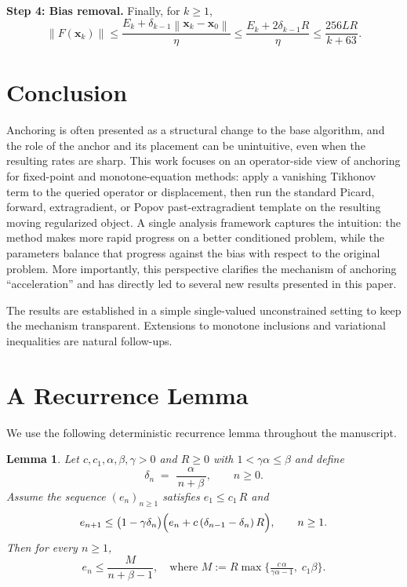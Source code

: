 \documentclass[letterpaper,11pt]{article}
\newcommand{\norm}[1]{\left\| #1 \right\|}
\newcommand{\vect}[1]{\mathbf{#1}}
\newtheorem{lemma}{Lemma}
\begin{document}
\smallskip
\noindent\textbf{Step 4: Bias removal.}
Finally, for \(k\ge1\),
\[
\norm{F(\vect{x}_k)}
\le
\frac{E_k+\delta_{k-1}\norm{\vect{x}_k-\vect{x}_0}}{\eta}
\le
\frac{E_k+2\delta_{k-1}R}{\eta}
\le
\frac{256LR}{k+63}.
\]



\section{Conclusion}
\label{sec:conclusion}

Anchoring is often presented as a structural change to the base algorithm, and the role of the anchor and its placement can be unintuitive, even when the resulting rates are sharp. This work focuses on an operator-side view of anchoring for fixed-point and monotone-equation methods: apply a vanishing Tikhonov term to the queried operator or displacement, then run the standard Picard, forward, extragradient, or Popov past-extragradient template on the resulting moving regularized object. A single analysis framework captures the intuition: the method makes more rapid progress on a better conditioned problem, while the parameters balance that progress against the bias with respect to the original problem. More importantly, this perspective clarifies the mechanism of anchoring ``acceleration'' and has directly led to several new results presented in this paper.

The results are established in a simple single-valued unconstrained setting to keep the mechanism transparent. Extensions to monotone inclusions and variational inequalities are natural follow-ups.

\appendix
{}
\section{A Recurrence Lemma}\label{app:technical-lemma}
We use the following deterministic recurrence lemma throughout the manuscript.

\begin{lemma}\label{lem:recurrence}
Let \(c,c_1,\alpha,\beta,\gamma>0\) and \(R\ge0\) with $1 < \gamma \alpha \le \beta$ and define
\[
   \delta_n \;=\; \frac{\alpha}{\,n+\beta\,}, 
   \qquad n\ge0.
\]
Assume the sequence \((e_n)_{n\ge 1}\) satisfies $e_1 \le c_1\,R$ and
\begin{equation} \label{eq:rec}
   e_{n+1}  \le \bigl(1-\gamma\delta_n\bigr)
         \Bigl(e_{n}+c\,(\delta_{n-1}-\delta_n)\,R\Bigr),
         \qquad n\ge 1. 
\end{equation}
Then for every \(n\ge 1\),
\[
   e_n \le \frac{M}{n + \beta - 1}, \quad \text{where }
        M := R\max\!\bigl\{
            \tfrac{c\,\alpha}{\gamma\alpha-1},
            \;c_1\beta
         \bigr\}.
\]
\end{lemma}
\end{document}
